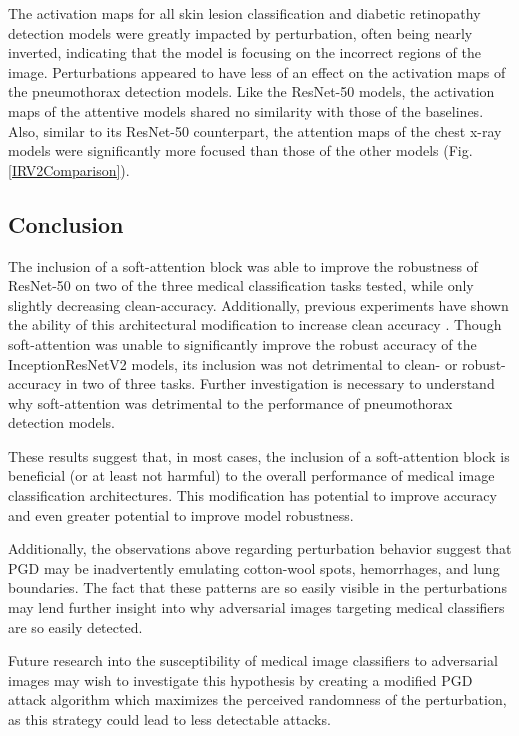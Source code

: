 \documentclass[10pt,twocolumn,letterpaper]{article}
\begin{document}
        The activation maps for all skin lesion classification and diabetic retinopathy detection models were greatly impacted by perturbation, often being nearly inverted, indicating that the model is focusing on the incorrect regions of the image. Perturbations appeared to have less of an effect on the activation maps of the pneumothorax detection models. Like the ResNet-50 models, the activation maps of the attentive models shared no similarity with those of the baselines. Also, similar to its ResNet-50 counterpart, the attention maps of the chest x-ray models were significantly more focused than those of the other models (Fig. \ref{IRV2Comparison}).

    \subsection{Conclusion} %
      The inclusion of a soft-attention block was able to improve the robustness of ResNet-50 on two of the three medical classification tasks tested, while only slightly decreasing clean-accuracy. Additionally, previous experiments have shown the ability of this architectural modification to increase clean accuracy \cite{AttentionSkinCancerClassification}. Though soft-attention was unable to significantly improve the robust accuracy of the InceptionResNetV2 models, its inclusion was not detrimental to clean- or robust-accuracy in two of three tasks. Further investigation is necessary to understand why soft-attention was detrimental to the performance of pneumothorax detection models.

      These results suggest that, in most cases, the inclusion of a soft-attention block is beneficial (or at least not harmful) to the overall performance of medical image classification architectures. This modification has potential to improve accuracy and even greater potential to improve model robustness.

      Additionally, the observations above regarding perturbation behavior suggest that PGD may be inadvertently emulating cotton-wool spots, hemorrhages, and lung boundaries. The fact that these patterns are so easily visible in the perturbations may lend further insight into why adversarial images targeting medical classifiers are so easily detected.

      Future research into the susceptibility of medical image classifiers to adversarial images may wish to investigate this hypothesis by creating a modified PGD attack algorithm which maximizes the perceived randomness of the perturbation, as this strategy could lead to less detectable attacks.
    
\end{document}
